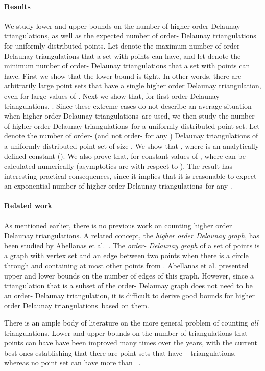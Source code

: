 \documentclass {journal}
\newcommand {\hodt}{higher order Delaunay triangulation}
\newcommand {\hodts}{higher order Delaunay triangulations}
\newcommand {\fodts}{first order Delaunay triangulations}
\begin{document}
\paragraph{Results} We study lower and upper bounds on the number of \hodts, as well
as the expected number of order- Delaunay triangulations for
uniformly distributed points. Let  denote the maximum
number of order- Delaunay triangulations that a set with 
points can have, and let  denote the minimum number of
order- Delaunay triangulations that a set with  points can
have. First we show that the lower bound  is
tight. In other words, there are arbitrarily large point sets that
have a single \hodt, even for large values of . Next we show
that, for \fodts, . Since these extreme cases
do not describe an average situation when \hodts\ are used, we
then study the number of \hodts\ for a uniformly distributed point
set. Let  denote the number of order- (and not order-
for any ) Delaunay triangulations of a uniformly
distributed point set of size . We show that , where  is an analytically defined
constant (). We also prove that, for
constant values of  ,
where  can be calculated numerically (asymptotics are with
respect to ). The result has interesting practical
consequences, since it implies that it is reasonable to expect an
exponential number of \hodts\ for any .


\paragraph{Related work}
As mentioned earlier, there is no previous work on counting \hodts.
A related concept, the \emph{higher order Delaunay graph}, has been studied by Abellanas et al.~\cite{apgh-sgtph-08}.
The \emph{order- Delaunay graph} of a set of points  is a graph with vertex set  and an edge between two points  when there is a circle through  and  containing at most  other points from .
Abellanas et al. presented upper and lower bounds on the number of edges of this graph. However, since a triangulation that is a subset of the order- Delaunay graph does not need to be an order- Delaunay triangulation, it is difficult to derive good bounds for \hodts\ based on them.

There is an ample body of literature on the more general problem of counting \emph{all} triangulations.
Lower and upper bounds on the number of triangulations that  points can have have been improved many times over the years, with the current best ones establishing that there are point sets that have ~\cite{ahhhk-npg-06} triangulations, whereas no point set can have more than ~\cite{sw-rtpps-06}.
\end{document}
